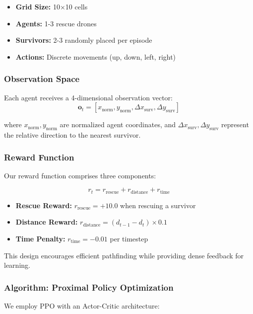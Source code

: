 \documentclass[conference]{IEEEtran}
\begin{document}
\begin{itemize}
    \item \textbf{Grid Size:} 10×10 cells
    \item \textbf{Agents:} 1-3 rescue drones
    \item \textbf{Survivors:} 2-3 randomly placed per episode
    \item \textbf{Actions:} Discrete movements (up, down, left, right)
\end{itemize}

\subsubsection{Observation Space}
Each agent receives a 4-dimensional observation vector:
\begin{equation}
    \mathbf{o}_t = [x_{\text{norm}}, y_{\text{norm}}, \Delta x_{\text{surv}}, \Delta y_{\text{surv}}]
\end{equation}

where $x_{\text{norm}}, y_{\text{norm}}$ are normalized agent coordinates, and $\Delta x_{\text{surv}}, \Delta y_{\text{surv}}$ represent the relative direction to the nearest survivor.

\subsubsection{Reward Function}
Our reward function comprises three components:

\begin{equation}
    r_t = r_{\text{rescue}} + r_{\text{distance}} + r_{\text{time}}
\end{equation}

\begin{itemize}
    \item \textbf{Rescue Reward:} $r_{\text{rescue}} = +10.0$ when rescuing a survivor
    \item \textbf{Distance Reward:} $r_{\text{distance}} = (d_{t-1} - d_t) \times 0.1$
    \item \textbf{Time Penalty:} $r_{\text{time}} = -0.01$ per timestep
\end{itemize}

This design encourages efficient pathfinding while providing dense feedback for learning.

\subsubsection{Algorithm: Proximal Policy Optimization}
We employ PPO with an Actor-Critic architecture:
\end{document}
